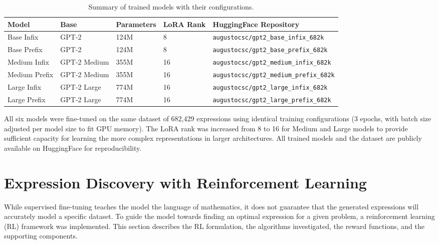 \begin{table}[h!]
    \centering
    \caption{Summary of trained models with their configurations.}
    \label{tab:models_trained}
    \begin{tabular}{lllll}
    \toprule
    \textbf{Model} & \textbf{Base} & \textbf{Parameters} & \textbf{LoRA Rank} & \textbf{HuggingFace Repository} \\
    \midrule
    Base Infix & GPT-2 & 124M & 8 & \texttt{augustocsc/gpt2\_base\_infix\_682k} \\
    Base Prefix & GPT-2 & 124M & 8 & \texttt{augustocsc/gpt2\_base\_prefix\_682k} \\
    Medium Infix & GPT-2 Medium & 355M & 16 & \texttt{augustocsc/gpt2\_medium\_infix\_682k} \\
    Medium Prefix & GPT-2 Medium & 355M & 16 & \texttt{augustocsc/gpt2\_medium\_prefix\_682k} \\
    Large Infix & GPT-2 Large & 774M & 16 & \texttt{augustocsc/gpt2\_large\_infix\_682k} \\
    Large Prefix & GPT-2 Large & 774M & 16 & \texttt{augustocsc/gpt2\_large\_prefix\_682k} \\
    \bottomrule
    \end{tabular}
\end{table}

All six models were fine-tuned on the same dataset of 682,429 expressions using identical training configurations (3 epochs, with batch size adjusted per model size to fit GPU memory). The LoRA rank was increased from 8 to 16 for Medium and Large models to provide sufficient capacity for learning the more complex representations in larger architectures. All trained models and the dataset are publicly available on HuggingFace for reproducibility.

\section{Expression Discovery with Reinforcement Learning}
\label{sec:expression_discovery}

While supervised fine-tuning teaches the model the language of mathematics, it does not guarantee that the generated expressions will accurately model a specific dataset. To guide the model towards finding an optimal expression for a given problem, a reinforcement learning (RL) framework was implemented. This section describes the RL formulation, the algorithms investigated, the reward functions, and the supporting components.

